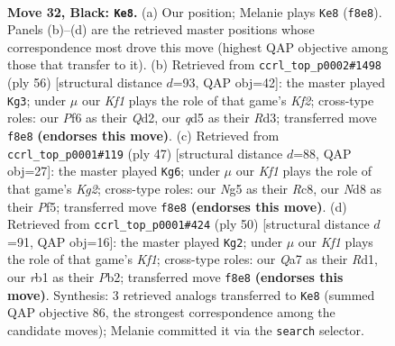 \documentclass[11pt]{article}
\begin{document}
\clearpage

\begin{figure}[p]\centering
\begin{subfigure}{0.46\textwidth}\centering
\resizebox{\linewidth}{!}{%
\newchessgame
\chessboard[
  setfen={r2n1k2/qp4p1/p4pN1/3Q2np/8/4P1P1/PP2RPBP/1R4K1 b - - 1 32},
  showmover=false,
  pgfstyle=straightmove, color=movearrow, markmove={f8-e8}
]}
\caption{}
\end{subfigure}\hfill
\begin{subfigure}{0.46\textwidth}\centering
\resizebox{\linewidth}{!}{%
\newchessgame
\chessboard[
  setfen={2k5/1ppr3p/pq4p1/N2nPp2/5P2/PP1R3P/3Q1KP1/8 w - - 1 29},
  showmover=false,
  pgfstyle=straightmove, color=movearrow, markmove={f2-g3}
]}
\caption{}
\end{subfigure}
\\[4pt]
\begin{subfigure}{0.46\textwidth}\centering
\resizebox{\linewidth}{!}{%
\newchessgame
\chessboard[
  setfen={2rq1r2/p2p2k1/1p6/4ppNp/6nP/1P1Q4/P1PP2P1/1K1RR3 b - - 3 24},
  showmover=false,
  pgfstyle=straightmove, color=movearrow, markmove={g7-g6}
]}
\caption{}
\end{subfigure}\hfill
\begin{subfigure}{0.46\textwidth}\centering
\resizebox{\linewidth}{!}{%
\newchessgame
\chessboard[
  setfen={r1br2k1/p4ppp/1p3q2/8/3Np3/P3P1PP/1P2QP2/3R1K1R w - - 4 26},
  showmover=false,
  pgfstyle=straightmove, color=movearrow, markmove={f1-g2}
]}
\caption{}
\end{subfigure}
\caption{\textbf{Move 32, Black: \texttt{Ke8}.} (a) Our position; Melanie plays \texttt{Ke8} (\texttt{f8e8}). Panels (b)--(d) are the retrieved master positions whose correspondence most drove this move (highest QAP objective among those that transfer to it). (b) Retrieved from \texttt{ccrl\_top\_p0002\#1498} (ply 56) [structural distance $d$=93, QAP obj=42]: the master played \texttt{Kg3}; under $\mu$ our \emph{Kf1} plays the role of that game's \emph{Kf2}; cross-type roles: our \emph{P}f6 as their \emph{Q}d2, our \emph{q}d5 as their \emph{R}d3; transferred move \texttt{f8e8} \textbf{(endorses this move)}. (c) Retrieved from \texttt{ccrl\_top\_p0001\#119} (ply 47) [structural distance $d$=88, QAP obj=27]: the master played \texttt{Kg6}; under $\mu$ our \emph{Kf1} plays the role of that game's \emph{Kg2}; cross-type roles: our \emph{N}g5 as their \emph{R}c8, our \emph{N}d8 as their \emph{P}f5; transferred move \texttt{f8e8} \textbf{(endorses this move)}. (d) Retrieved from \texttt{ccrl\_top\_p0001\#424} (ply 50) [structural distance $d$=91, QAP obj=16]: the master played \texttt{Kg2}; under $\mu$ our \emph{Kf1} plays the role of that game's \emph{Kf1}; cross-type roles: our \emph{Q}a7 as their \emph{R}d1, our \emph{r}b1 as their \emph{P}b2; transferred move \texttt{f8e8} \textbf{(endorses this move)}. Synthesis: 3 retrieved analogs transferred to \texttt{Ke8} (summed QAP objective 86, the strongest correspondence among the candidate moves); Melanie committed it via the \texttt{search} selector.}
\label{fig:thought-m63}
\end{figure}
\end{document}
